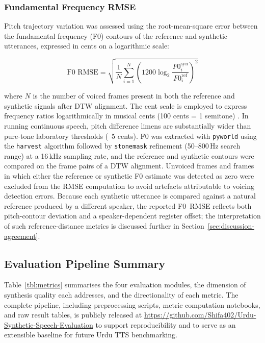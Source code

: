 \documentclass[a4paper,fleqn]{cas-dc}
\begin{document}
    \subsubsection{Fundamental Frequency RMSE}\label{sec:methodology-f0}
    
    Pitch trajectory variation was assessed using the root-mean-square error between
    the fundamental frequency (F0) contours of the reference and synthetic
    utterances, expressed in cents on a logarithmic scale:
    
    \begin{equation}
      \text{F0 RMSE} = \sqrt{ \frac{1}{N} \sum_{i=1}^{N}
      \left( 1200 \log_2 \frac{F0_i^{\text{syn}}}{F0_i^{\text{ref}}}
      \right)^2 }
      \label{eq:f0rmse}
    \end{equation}
    
    \noindent where $N$ is the number of voiced frames present in both
    the reference and synthetic signals after DTW alignment. The cent
    scale is employed to express frequency ratios logarithmically in musical cents
    (100 cents = 1 semitone) \citep{fastl2007psychoacoustics}. In running continuous speech,
    pitch difference limens are substantially wider than pure-tone laboratory thresholds (~5 cents).
    F0 was extracted with \texttt{pyworld} using
    the \texttt{harvest} algorithm followed by \texttt{stonemask}
    refinement (50--800\,Hz search range) at a 16\,kHz sampling rate, and
    the reference and synthetic contours were compared on the frame pairs
    of a DTW alignment. Unvoiced frames and frames in which either the
    reference or synthetic F0 estimate was detected as zero were excluded
    from the RMSE computation to avoid artefacts attributable to voicing
    detection errors. Because each synthetic utterance is compared against
    a natural reference produced by a different speaker, the reported
    F0~RMSE reflects both pitch-contour deviation and a speaker-dependent
    register offset; the interpretation of such reference-distance metrics is
    discussed further in Section~\ref{sec:discussion-agreement}.
    
    \subsection{Evaluation Pipeline Summary}\label{sec:methodology-pipeline}
    
    Table~\ref{tbl:metrics} summarises the four evaluation modules,
    the dimension of synthesis quality each addresses, and the
    directionality of each metric. The complete pipeline, including
    preprocessing scripts, metric computation notebooks, and raw result
    tables, is publicly released at
    \url{https://github.com/Shifa402/Urdu-Synthetic-Speech-Evaluation}
    to support reproducibility and to serve as an extensible baseline
    for future Urdu TTS benchmarking.
    
\end{document}
